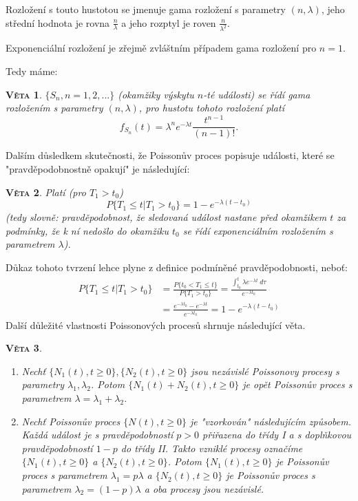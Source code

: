 \documentclass[10pt]{article}
\newtheorem{proposition}{\textsc{Věta}}
\begin{document}
Rozložení s touto hustotou se jmenuje gama rozložení s parametry $(n,\lambda)$, jeho střední hodnota je rovna $\frac{n}{\lambda}$ a jeho rozptyl je roven $\frac{n}{\lambda^2}$.

Exponenciální rozložení je zřejmě zvláštním případem gama rozložení pro $n=1$.

Tedy máme:

\begin{proposition}
$\{S_n, n=1,2,...\}$ (okamžiky výskytu $n$-té události) se řídí gama rozložením s parametry $(n,\lambda)$, pro hustotu tohoto rozložení platí 
\begin{equation}
f_{S_n} (t) = \lambda^n e^{-\lambda t} \frac{t^{n-1}}{(n-1)!}.
\end{equation}
\end{proposition}

Dalším důsledkem skutečnosti, že Poissonův proces popisuje události, které se "pravděpodobnostně opakují" je následující:

\begin{proposition}
Platí (pro $T_1>t_0$)
\begin{equation}
P\{T_1 \leq t | T_1 > t_0\} = 1-e^{- \lambda (t-t_0)}
\end{equation}
(tedy slovně: pravděpodobnost, že sledovaná událost nastane před okamžikem $t$ za podmínky, že k ní nedošlo do okamžiku $t_0$ se řídí exponenciálním rozložením s parametrem $\lambda$).
\end{proposition}

Důkaz tohoto tvrzení lehce plyne z definice podmíněné pravděpodobnosti, neboť:
\begin{equation*}
\begin{split}
P\{T_1 \leq t | T_1>t_0\} 	&= \frac{P\{t_0<T_1 \leq t\}}{P\{T_1 > t_0\}} = \frac{\int_{t_0}^{t} \lambda e^{-\lambda t} \ d \tau}{e^{-\lambda t_0}}\\
					&= \frac{e^{-\lambda t_0}-e^{-\lambda t}}{e^{-\lambda t_0}} = 1-e^{-\lambda (t-t_0)}
\end{split}
\end{equation*}
Další důležité vlastnosti Poissonových procesů shrnuje následující věta.

\begin{proposition}

\begin{enumerate}
\item Nechť $\{N_1(t),t \geq 0\},\{N_2(t),t \geq 0\}$ jsou nezávislé Poissonovy procesy s parametry $\lambda_1, \lambda_2$. Potom $\{N_1(t)+N_2(t), t \geq 0\}$ je opět Poissonův proces s parametrem $\lambda = \lambda_1 + \lambda_2$.
\item Nechť Poissonův proces $\{N(t),t \geq 0\}$ je "vzorkován" následujícím způsobem. Každá událost je s pravděpodobností $p>0$ přiřazena do třídy I a s doplňkovou pravděpodobností $1-p$ do třídy II. Takto vzniklé procesy označíme $\{N_1(t),t \geq 0\}$ a $\{N_2(t),t \geq 0\}$. Potom $\{N_1(t),t \geq 0\}$ je Poissonův proces s parametrem $\lambda_1 = p \lambda$ a $\{N_2(t),t \geq 0\}$ je Poissonův proces s parametrem $\lambda_2 = (1-p) \lambda$ a oba procesy jsou nezávislé.
\end{enumerate}
\end{proposition}
\end{document}
